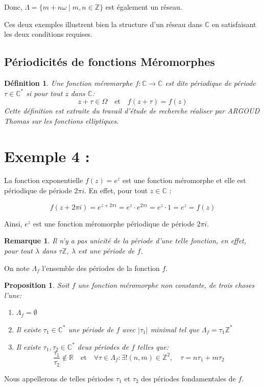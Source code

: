 \documentclass[12pt]{article}
\newtheorem{remark}{Remarque}
\newtheorem{definition}{Définition}
\newtheorem{proposition}{Proposition}
\begin{document}
Donc, \(\Lambda = \{ m + n\omega \mid m, n \in \mathbb{Z} \}\) est également un réseau.

Ces deux exemples illustrent bien la structure d'un réseau dans \(\mathbb{C}\) en satisfaisant les deux conditions requises.
\subsection{Périodicités de fonctions Méromorphes}
\begin{definition}
 \quad Une fonction méromorphe \( f: \mathbb{C} \to \mathbb{C} \) est dite \textit{périodique de période} \( \tau \in \mathbb{C}^* \) si pour tout \( z \) dans \( \mathbb{C} \):
\[
z + \tau \in \Omega \quad \text{et} \quad f(z + \tau) = f(z)
\]
\textit{Cette définition est extraite du travail d'étude de recherche réaliser par ARGOUD Thomas sur les fonctions elliptiques.}
\end{definition}
\section*{Exemple 4 : }

La fonction exponentielle \( f(z) = e^z \) est une fonction méromorphe et elle est périodique de période \( 2\pi i \). En effet, pour tout \( z \in \mathbb{C} \) :

\[
f(z + 2\pi i) = e^{z + 2\pi i} = e^z \cdot e^{2\pi i} = e^z \cdot 1 = e^z = f(z)
\]

Ainsi, \( e^z \) est une fonction méromorphe périodique de période \( 2\pi i \).

\begin{remark}
 Il n'y a pas unicité de la période d'une telle fonction, en effet, pour tout \( \lambda \) dans \( \tau \mathbb{Z} \), \( \lambda\) est une période de \( f \).
 \end{remark}
On note \( \Lambda_f \) l'ensemble des périodes de la fonction \( f \).

\begin{proposition}
Soit \( f \) une fonction méromorphe non constante, de trois choses l'une:



\begin{enumerate}
    \item \( \Lambda_f = \emptyset \)
    \item Il existe \( \tau_1 \in \mathbb{C}^* \) une période de \( f \) avec \( |\tau_1| \) minimal tel que \( \Lambda_f = \tau_1 \mathbb{Z}^* \)
    \item Il existe \( \tau_1, \tau_2 \in \mathbb{C}^* \) deux périodes de \( f \) telles que:
    \[
    \frac{\tau_1}{\tau_2} \notin \mathbb{R} \quad \text{et} \quad \forall \tau \in \Lambda_f:  \exists! (n, m) \in \mathbb{Z}^2, \quad \tau = n\tau_1 + m\tau_2
    \]
\end{enumerate}
\end{proposition}
Nous appellerons de telles périodes \( \tau_1 \) et \( \tau_2 \) des périodes fondamentales de \( f \).
\end{document}

